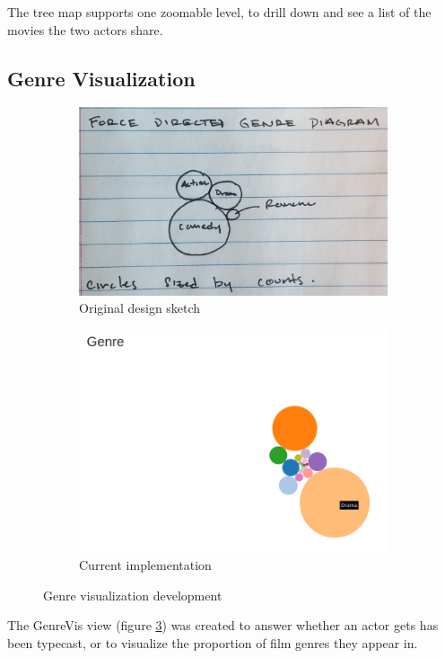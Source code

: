 \documentclass[12pt]{article}
\begin{document}
The tree map supports one zoomable level, to drill down and see a list of the movies the two actors share.
\newpage

\subsection{Genre Visualization}

	\begin{figure}[h!]
		\centering
		\begin{subfigure}[t]{.5\textwidth}
		  \centering
		  \includegraphics[width=\linewidth]{images/genreVis_crop.png}
		  \caption{Original design sketch}
		  \label{fig:sub1}
		\end{subfigure}%
		\begin{subfigure}[t]{.8\textwidth}
		  \centering
		  \includegraphics[width=.7\linewidth]{images/genreVis.png}
		  \caption{Current implementation}
		  \label{fig:sub2}
		\end{subfigure}%
		\caption{Genre visualization development}
		\label{fig:genreVis}
	\end{figure}

	
The GenreVis view (figure \ref{fig:genreVis}) was created to answer whether  an actor gets has been typecast, or to visualize the proportion of film genres they appear in.  
\end{document}
